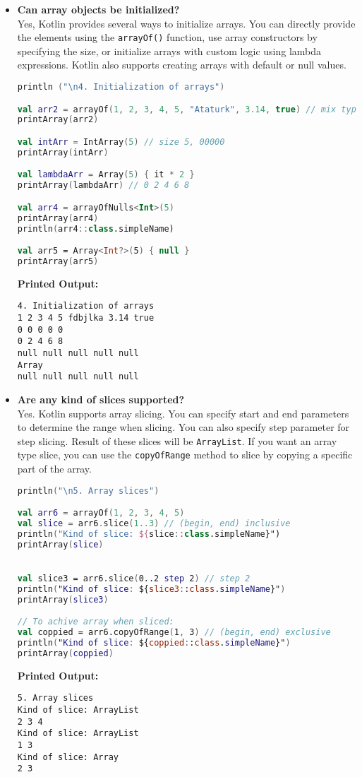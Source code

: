 \documentclass{article}
\begin{document}
\begin{itemize}
\item \textbf{Can array objects be initialized?} \\
Yes, Kotlin provides several ways to initialize arrays. You can directly provide the elements using the \texttt{arrayOf()} function, use array constructors by specifying the size, or initialize arrays with custom logic using lambda expressions. Kotlin also supports creating arrays with default or null values.
\begin{lstlisting}[language=Kotlin]
println ("\n4. Initialization of arrays")

val arr2 = arrayOf(1, 2, 3, 4, 5, "Ataturk", 3.14, true) // mix type
printArray(arr2) 

val intArr = IntArray(5) // size 5, 00000
printArray(intArr)

val lambdaArr = Array(5) { it * 2 }
printArray(lambdaArr) // 0 2 4 6 8

val arr4 = arrayOfNulls<Int>(5)
printArray(arr4) 
println(arr4::class.simpleName)

val arr5 = Array<Int?>(5) { null }
printArray(arr5)
\end{lstlisting}
\textbf{Printed Output:}
\begin{verbatim}
4. Initialization of arrays
1 2 3 4 5 fdbjlka 3.14 true 
0 0 0 0 0 
0 2 4 6 8 
null null null null null 
Array
null null null null null
\end{verbatim}

    
    
\item \textbf{Are any kind of slices supported?} \\
Yes. Kotlin supports array slicing. You can specify start and end parameters to determine the range when slicing. You can also specify step parameter for step slicing. Result of these slices will be \texttt{ArrayList}. If you want an array type slice, you can use the \texttt{copyOfRange} method to slice by copying a specific part of the array.
\begin{lstlisting}[language=Kotlin]
println("\n5. Array slices")

val arr6 = arrayOf(1, 2, 3, 4, 5)
val slice = arr6.slice(1..3) // (begin, end) inclusive
println("Kind of slice: ${slice::class.simpleName}") 
printArray(slice)


val slice3 = arr6.slice(0..2 step 2) // step 2
println("Kind of slice: ${slice3::class.simpleName}") 
printArray(slice3)

// To achive array when sliced:
val coppied = arr6.copyOfRange(1, 3) // (begin, end) exclusive
println("Kind of slice: ${coppied::class.simpleName}") 
printArray(coppied)
\end{lstlisting}
\textbf{Printed Output:}
\begin{verbatim}
5. Array slices
Kind of slice: ArrayList
2 3 4 
Kind of slice: ArrayList
1 3 
Kind of slice: Array
2 3
\end{verbatim}





\end{itemize}
\end{document}
